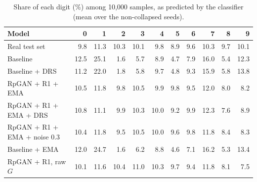 \begin{table}[H]
\centering
\footnotesize
\setlength{\tabcolsep}{4pt}
\begin{tabular}{lrrrrrrrrrr}
\toprule
Model & 0 & 1 & 2 & 3 & 4 & 5 & 6 & 7 & 8 & 9 \\
\midrule
Real test set & 9.8 & 11.3 & 10.3 & 10.1 & 9.8 & 8.9 & 9.6 & 10.3 & 9.7 & 10.1 \\
Baseline & 12.5 & 25.1 & 1.6 & 5.7 & 8.9 & 4.7 & 7.9 & 16.0 & 5.4 & 12.3 \\
Baseline + DRS & 11.2 & 22.0 & 1.8 & 5.8 & 9.7 & 4.8 & 9.3 & 15.9 & 5.8 & 13.8 \\
RpGAN + R1 + EMA & 10.5 & 11.8 & 9.8 & 10.5 & 9.9 & 9.8 & 9.5 & 12.0 & 8.0 & 8.2 \\
RpGAN + R1 + EMA + DRS & 10.8 & 11.1 & 9.9 & 10.3 & 10.0 & 9.2 & 9.9 & 12.3 & 7.6 & 8.9 \\
RpGAN + R1 + EMA + noise 0.3 & 10.4 & 11.8 & 9.5 & 10.5 & 10.0 & 9.6 & 9.8 & 11.8 & 8.4 & 8.3 \\
Baseline + EMA & 12.0 & 24.7 & 1.6 & 6.2 & 8.8 & 4.6 & 7.1 & 16.2 & 5.3 & 13.4 \\
RpGAN + R1, raw $G$ & 10.1 & 11.6 & 10.4 & 11.0 & 10.3 & 9.7 & 9.4 & 11.8 & 8.1 & 7.5 \\
\bottomrule
\end{tabular}
\caption{Share of each digit (\%) among 10,000 samples, as predicted by the classifier (mean over the non-collapsed seeds).}
\label{tab:supp-digits}
\end{table}
